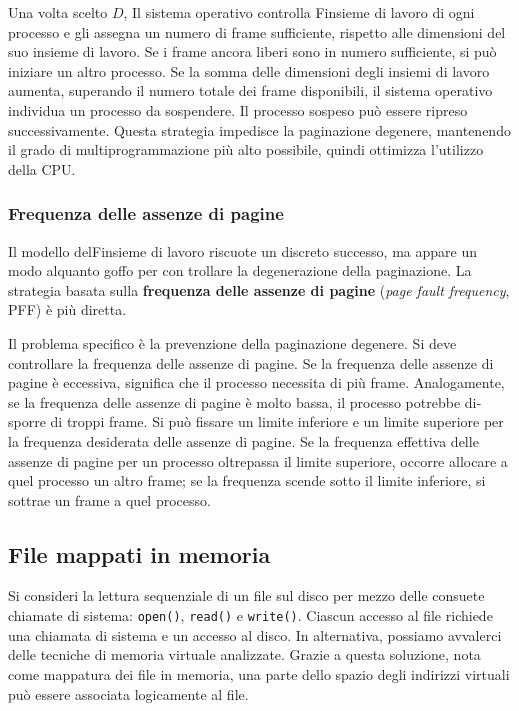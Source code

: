 \documentclass[11pt,a4paper]{article}
\begin{document}
{Una volta scelto $D$, Il
sistema operativo controlla Finsieme di lavoro di ogni processo e gli assegna un numero di
frame sufficiente, rispetto alle dimensioni del suo insieme di lavoro. Se i frame ancora liberi
sono in numero sufficiente, si può iniziare un altro processo. Se la somma delle dimensioni
degli insiemi di lavoro aumenta, superando il numero totale dei frame disponibili, il sistema
operativo individua un processo da sospendere. Il processo sospeso può essere ripre­so successivamente.
Questa strategia impedisce la paginazione degenere, mantenendo il grado di multipro­grammazione più alto possibile, quindi ottimizza l'utilizzo della CPU.

\subsubsection{Frequenza delle assenze di pagine}
Il modello delFinsieme di lavoro riscuote un discreto successo, ma appare un modo alquanto goffo per con­
trollare la degenerazione della paginazione. La strategia basata sulla \textbf{frequenza delle assenze
di pagine} (\emph{page fault frequency}, PFF) è più diretta.

Il problema specifico è la prevenzione della paginazione degenere. Si deve controllare la frequenza delle assenze di pagine. Se la
frequenza delle assenze di pagine è eccessiva, significa che il processo necessita di più frame.
Analogamente, se la frequenza delle assenze di pagine è molto bassa, il processo potrebbe di­sporre di troppi frame. Si può fissare un limite inferiore e un limite superiore per la fre­quenza desiderata delle assenze di pagine. Se la frequenza
effettiva delle assenze di pagine per un processo oltrepassa il limite superiore, occorre alloca­re a quel processo un altro frame; se la frequenza scende sotto il limite inferiore, si sottrae un
frame a quel processo.

\subsection{File mappati in memoria}
Si consideri la lettura sequenziale di un file sul disco per mezzo delle consuete chiamate di
sistema: \texttt{open()}, \texttt{read()} e \texttt{write()}. Ciascun accesso al file richiede una chiamata di si­stema e un accesso al disco. In alternativa, possiamo avvalerci delle tecniche di memoria vir­tuale analizzate. Gra­zie a questa soluzione, nota come mappatura dei file in memoria, una parte dello spazio de­gli indirizzi virtuali può essere associata logicamente al file.

}
\end{document}
